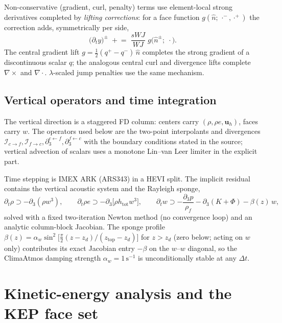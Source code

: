 \documentclass[11pt]{article}
\newcommand{\uu}{\boldsymbol{u}}
\newcommand{\uh}{\uu_h}
\begin{document}
Non-conservative (gradient, curl, penalty) terms use element-local strong
derivatives completed by \emph{lifting corrections}: for a face function
$g(\hat n;\,\cdot^-,\cdot^+)$ the correction adds, symmetrically per
side,
\begin{equation}
\big(\partial_t y\big)^\pm \;+\!\!=\;
\frac{s\!W\!J}{WJ}\; g\big(\hat n^\pm;\; \cdot\big).
\label{eq:lift}
\end{equation}
The central gradient lift $g = \tfrac12(q^+ - q^-)\,\hat n$ completes the
strong gradient of a discontinuous scalar $q$; the analogous central
curl and divergence lifts complete $\nabla\times$ and $\nabla\cdot$.
$\lambda$-scaled jump penalties use the same mechanism.

\subsection{Vertical operators and time integration}

The vertical direction is a staggered FD column: centers carry
$(\rho, \rho e, \uh)$, faces carry $w$. The operators used below are the
two-point interpolants and divergences
$\mathcal{I}_{c\to f}, \mathcal{I}_{f\to c},
\partial^{c\leftarrow f}_3, \partial^{f\leftarrow c}_3$ with the
boundary conditions stated in the source; vertical advection of scalars
uses a monotone Lin--van Leer limiter in the explicit part.

Time stepping is IMEX ARK (ARS343) in a HEVI split. The implicit residual
contains the vertical acoustic system and the Rayleigh sponge,
\begin{equation}
\partial_t \rho \supset -\partial_3(\rho w^3),\qquad
\partial_t \rho e \supset -\partial_3\big[\rho h_{\mathrm{tot}} w^3\big],\qquad
\partial_t w \supset -\frac{\partial_3 p}{\rho_f}
 - \partial_3(K+\Phi) - \beta(z)\,w,
\label{eq:implicit}
\end{equation}
solved with a fixed two-iteration Newton method (no convergence loop) and
an analytic column-block Jacobian. The sponge profile
$\beta(z) = \alpha_w \sin^2\!\big[\tfrac{\pi}{2}(z -
z_d)/(z_{\mathrm{top}}-z_d)\big]$ for $z > z_d$ (zero below; acting on
$w$ only) contributes its exact Jacobian entry $-\beta$ on the $w$--$w$
diagonal, so the ClimaAtmos damping strength $\alpha_w =
1\,\mathrm{s}^{-1}$ is unconditionally stable at any $\Delta t$.

\section{Kinetic-energy analysis and the KEP face set}
\label{sec:kep}
\end{document}
